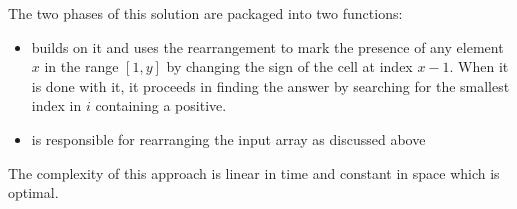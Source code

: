 The two phases of this solution are packaged into two functions:
\begin{itemize}
	\item {} builds on it and uses the rearrangement to mark the presence of any element $x$ in the range $[1,y]$ by changing the sign of the cell at index $x-1$. When it is done with it, it proceeds in finding the answer by searching for the smallest index in $i$ containing a positive.
	\item {} is responsible for rearranging the input array as discussed above
\end{itemize}

The complexity of this approach is linear in time and constant in space which is optimal.